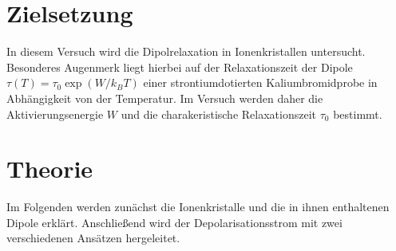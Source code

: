 \section{Zielsetzung}
\label{sec:Zielsetzung}
In diesem Versuch wird die Dipolrelaxation in Ionenkristallen untersucht. Besonderes Augenmerk liegt hierbei auf der Relaxationszeit der Dipole
$\tau(T)=\tau_0 \exp(W/k_BT)$ einer strontiumdotierten Kaliumbromidprobe in Abhängigkeit von der Temperatur.
Im Versuch werden daher die Aktivierungsenergie $W$ und die charakeristische Relaxationszeit $\tau_0$ bestimmt.

\section{Theorie}
\label{sec:Theorie}
 
Im Folgenden werden zunächst die Ionenkristalle und die in ihnen enthaltenen Dipole erklärt. Anschließend wird der 
Depolarisationsstrom mit zwei verschiedenen Ansätzen hergeleitet.

